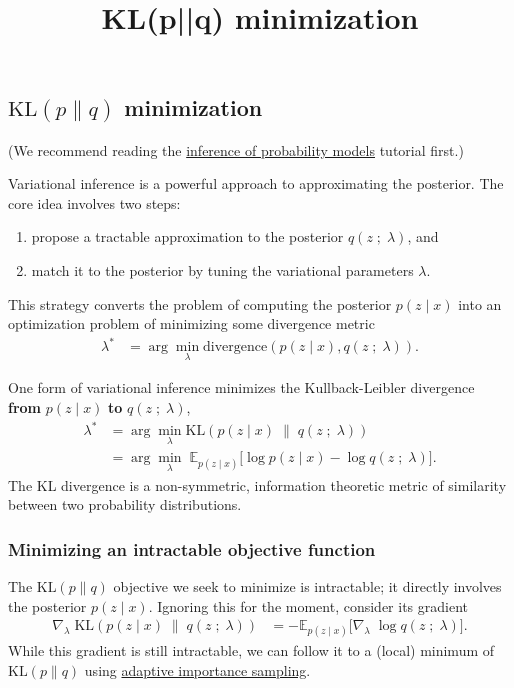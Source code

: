 \title{KL(p||q) minimization}

\subsection{$\text{KL}(p\|q)$ minimization}

(We recommend reading the 
\href{tut_inference_probability_models.html}{inference of probability models}
tutorial first.)

Variational inference is a powerful approach to approximating the posterior. The
core idea involves two steps:
\begin{enumerate}
   \item propose a tractable approximation to the posterior $q(z\;;\;\lambda)$,
   and
   \item match it to the posterior by tuning the variational
   parameters $\lambda$.
 \end{enumerate} 
This strategy converts the problem of computing the posterior $p(z \mid x)$ into
an optimization problem of minimizing some divergence metric
\begin{align*}
  \lambda^* 
  &=
  \arg\min_\lambda \text{divergence}( 
  p(z \mid x)
  ,
  q(z\;;\;\lambda)
  ).
\end{align*}

One form of variational inference minimizes the Kullback-Leibler divergence 
\textbf{from} $p(z \mid x)$ \textbf{to} $q(z\;;\;\lambda)$,
\begin{align*}
  \lambda^* 
  &=
  \arg\min_\lambda \text{KL}( 
  p(z \mid x)
  \;\|\;
  q(z\;;\;\lambda)
  )\\
  &=
  \arg\min_\lambda\;
  \mathbb{E}_{p(z \mid x)}
  \big[
  \log p(z \mid x)
  -
  \log q(z\;;\;\lambda)
  \big].
\end{align*}
The KL divergence is a non-symmetric, information theoretic metric of
similarity between two probability distributions. 

\subsubsection{Minimizing an intractable objective function}

The $\text{KL}(p\|q)$ objective we seek to minimize is intractable; it directly
involves the posterior $p(z \mid x)$. Ignoring this for the moment, consider its
gradient
\begin{align*}
  \nabla_\lambda\;
  \text{KL}( 
  p(z \mid x)
  \;\|\;
  q(z\;;\;\lambda)
  )
  &=
  -
  \mathbb{E}_{p(z \mid x)}
  \big[
  \nabla_\lambda\;
  \log q(z\;;\;\lambda)
  \big].
\end{align*}
While this gradient is still intractable, we can follow it to a (local) minimum
of $\text{KL}(p\|q)$ using
\href{tut_KLpq_ais.html}{adaptive importance sampling}.
